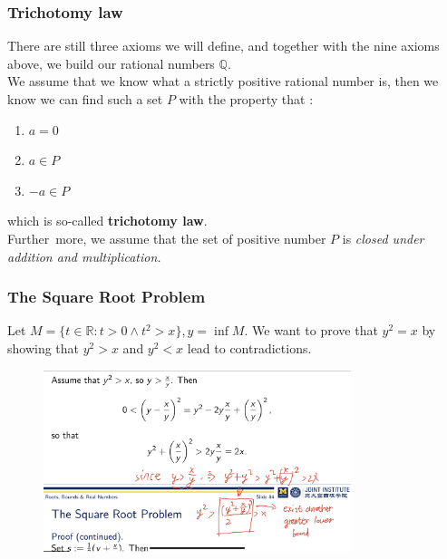 \documentclass{beamer}
\newcommand{\myfont}{\rmfamily\normalsize\upshape\mdseries}
\begin{document}
\begin{frame}
    \frametitle{Trichotomy law}
    \hspace{1em}
    There are still three axioms we will define, and together with the nine axioms above, 
we build our rational numbers $\mathbb{Q}$.\\
    \vspace{1em} 
    \hspace{1em}   
    We assume that we know what a strictly positive rational number is, then we know we can find such 
    a set $P$ with the property that :
    \hspace{1em}
    \begin{enumerate}
        \item $a=0$
        \item $a\in P$
        \item $-a\in P$
    \end{enumerate}
which is so-called \textbf{trichotomy law}.\\
\hspace{1em}
Further more, we assume that the set of positive number $P$ is 
\itshape closed under addition and multiplication.\\
\myfont
\end{frame}
\begin{frame}
    \frametitle{The Square Root Problem}
    \hspace{1em}
    Let $M=\{t \in \mathbb{R} : t>0 \wedge t^2>x \}, y=\inf M.$
    We want to prove that $y^2=x$ by showing that $y^2 > x$ and $y^2<x$ 
    lead to contradictions.
    \begin{figure}
        \centering
        \includegraphics[width=0.8\textwidth]{square.jpg}
    \end{figure}
\end{frame}
\end{document}
